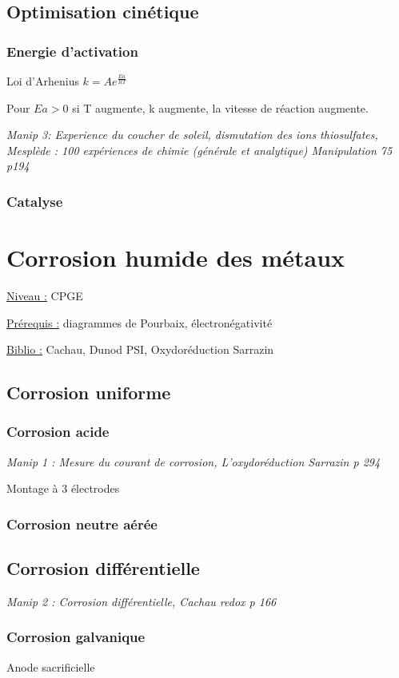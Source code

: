 \documentclass{article}%
\begin{document}
\subsection{Optimisation cinétique}
\subsubsection{Energie d'activation}

Loi d'Arhenius $k=A e^{\frac{Ea}{RT}}$

Pour $Ea > 0$ si T augmente, k augmente, la vitesse de réaction augmente.



\textit{Manip 3: Experience du coucher de soleil, dismutation des ions thiosulfates, Mesplède : 100 expériences de chimie (générale et analytique) Manipulation 75 p194}
\subsubsection{Catalyse}

\section{Corrosion humide des métaux}
\underline{Niveau :} CPGE 

\underline{Prérequis :} diagrammes de Pourbaix, électronégativité

\underline{Biblio :} Cachau, Dunod PSI, Oxydoréduction Sarrazin

\subsection{Corrosion uniforme}
\subsubsection{Corrosion acide}
\textit{Manip 1 : Mesure du courant de corrosion, L'oxydoréduction Sarrazin p 294}

Montage à 3 électrodes
\subsubsection{Corrosion neutre aérée}
\subsection{Corrosion différentielle}
\textit{Manip 2 : Corrosion différentielle, Cachau redox p 166}
\subsubsection{Corrosion galvanique}
Anode sacrificielle
\end{document}
